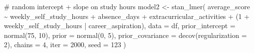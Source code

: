 \documentclass[
  letterpaper,
  DIV=11,
  numbers=noendperiod]{scrartcl}
\newenvironment{Shaded}{\begin{snugshade}}{\end{snugshade}}
\newcommand{\AttributeTok}[1]{\textcolor[rgb]{0.40,0.45,0.13}{#1}}
\newcommand{\CommentTok}[1]{\textcolor[rgb]{0.37,0.37,0.37}{#1}}
\newcommand{\DecValTok}[1]{\textcolor[rgb]{0.68,0.00,0.00}{#1}}
\newcommand{\FunctionTok}[1]{\textcolor[rgb]{0.28,0.35,0.67}{#1}}
\newcommand{\NormalTok}[1]{\textcolor[rgb]{0.00,0.23,0.31}{#1}}
\newcommand{\OtherTok}[1]{\textcolor[rgb]{0.00,0.23,0.31}{#1}}
\newcommand{\SpecialCharTok}[1]{\textcolor[rgb]{0.37,0.37,0.37}{#1}}
\begin{document}
\begin{Shaded}
\begin{Highlighting}[]
\CommentTok{\# random intercept + slope on study hours}
\NormalTok{model2 }\OtherTok{\textless{}{-}} \FunctionTok{stan\_lmer}\NormalTok{(}
\NormalTok{  average\_score }\SpecialCharTok{\textasciitilde{}}\NormalTok{ weekly\_self\_study\_hours }
                \SpecialCharTok{+}\NormalTok{ absence\_days }
                \SpecialCharTok{+}\NormalTok{ extracurricular\_activities }
                \SpecialCharTok{+}\NormalTok{ (}\DecValTok{1} \SpecialCharTok{+}\NormalTok{ weekly\_self\_study\_hours }\SpecialCharTok{|}\NormalTok{ career\_aspiration),}
  \AttributeTok{data =}\NormalTok{ df,}
  \AttributeTok{prior\_intercept    =} \FunctionTok{normal}\NormalTok{(}\DecValTok{75}\NormalTok{, }\DecValTok{10}\NormalTok{),}
  \AttributeTok{prior              =} \FunctionTok{normal}\NormalTok{(}\DecValTok{0}\NormalTok{, }\DecValTok{5}\NormalTok{),}
  \AttributeTok{prior\_covariance   =} \FunctionTok{decov}\NormalTok{(}\AttributeTok{regularization =} \DecValTok{2}\NormalTok{),}
  \AttributeTok{chains =} \DecValTok{4}\NormalTok{, }\AttributeTok{iter =} \DecValTok{2000}\NormalTok{, }\AttributeTok{seed =} \DecValTok{123}
\NormalTok{)}
\end{Highlighting}
\end{Shaded}
\end{document}
